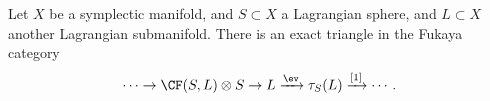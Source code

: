 
    Let $X$ be a symplectic manifold, and $S\subset X$ a Lagrangian sphere, and $L\subset X$ another Lagrangian submanifold. There is an exact triangle in the Fukaya category
    \[ \cdots \to \CF(S, L)\otimes S \to L \xrightarrow{\ev} \tau_S(L)\xrightarrow{[1]}\cdots.\]

